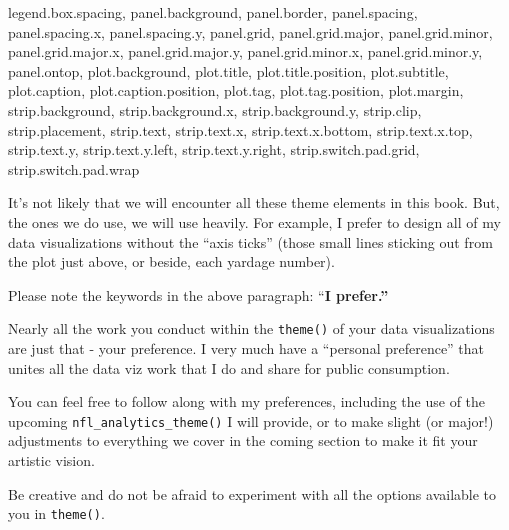 \documentclass[
  letterpaper,
]{krantz}
\newenvironment{Shaded}{\begin{snugshade}}{\end{snugshade}}
\newcommand{\NormalTok}[1]{\textcolor[rgb]{0.00,0.23,0.31}{#1}}
\begin{document}
\begin{Shaded}
\begin{Highlighting}[]
\NormalTok{  legend.box.spacing,}
\NormalTok{  panel.background,}
\NormalTok{  panel.border,}
\NormalTok{  panel.spacing,}
\NormalTok{  panel.spacing.x,}
\NormalTok{  panel.spacing.y,}
\NormalTok{  panel.grid,}
\NormalTok{  panel.grid.major,}
\NormalTok{  panel.grid.minor,}
\NormalTok{  panel.grid.major.x,}
\NormalTok{  panel.grid.major.y,}
\NormalTok{  panel.grid.minor.x,}
\NormalTok{  panel.grid.minor.y,}
\NormalTok{  panel.ontop,}
\NormalTok{  plot.background,}
\NormalTok{  plot.title,}
\NormalTok{  plot.title.position,}
\NormalTok{  plot.subtitle,}
\NormalTok{  plot.caption,}
\NormalTok{  plot.caption.position,}
\NormalTok{  plot.tag,}
\NormalTok{  plot.tag.position,}
\NormalTok{  plot.margin,}
\NormalTok{  strip.background,}
\NormalTok{  strip.background.x,}
\NormalTok{  strip.background.y,}
\NormalTok{  strip.clip,}
\NormalTok{  strip.placement,}
\NormalTok{  strip.text,}
\NormalTok{  strip.text.x,}
\NormalTok{  strip.text.x.bottom,}
\NormalTok{  strip.text.x.top,}
\NormalTok{  strip.text.y,}
\NormalTok{  strip.text.y.left,}
\NormalTok{  strip.text.y.right,}
\NormalTok{  strip.switch.pad.grid,}
\NormalTok{  strip.switch.pad.wrap}
\end{Highlighting}
\end{Shaded}

It's not likely that we will encounter all these theme elements in this
book. But, the ones we do use, we will use heavily. For example, I
prefer to design all of my data visualizations without the ``axis
ticks'' (those small lines sticking out from the plot just above, or
beside, each yardage number).

\begin{tcolorbox}[enhanced jigsaw, left=2mm, toprule=.15mm, opacitybacktitle=0.6, leftrule=.75mm, bottomrule=.15mm, colbacktitle=quarto-callout-tip-color!10!white, breakable, colback=white, bottomtitle=1mm, toptitle=1mm, title=\textcolor{quarto-callout-tip-color}{\faLightbulb}\hspace{0.5em}{Tip}, coltitle=black, titlerule=0mm, arc=.35mm, opacityback=0, colframe=quarto-callout-tip-color-frame, rightrule=.15mm]

Please note the keywords in the above paragraph: ``\textbf{I prefer.''}

Nearly all the work you conduct within the \texttt{theme()} of your data
visualizations are just that - your preference. I very much have a
``personal preference'' that unites all the data viz work that I do and
share for public consumption.

You can feel free to follow along with my preferences, including the use
of the upcoming \texttt{nfl\_analytics\_theme()} I will provide, or to
make slight (or major!) adjustments to everything we cover in the coming
section to make it fit your artistic vision.

Be creative and do not be afraid to experiment with all the options
available to you in \texttt{theme()}.

\end{tcolorbox}
\end{document}
